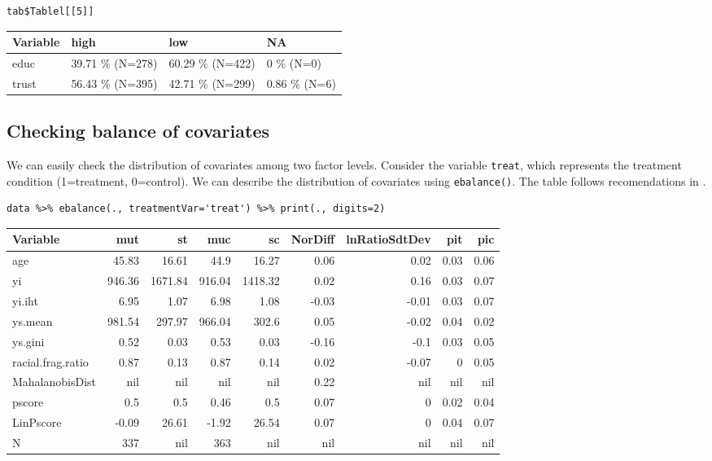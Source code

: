 \documentclass[a4paper]{article}
\begin{document}
\lstset{numbers=left,language=r,label=org3bbdb71,caption= ,captionpos=b}
\begin{lstlisting}
tab$Tablel[[5]]
\end{lstlisting}

\begin{center}
\begin{tabular}{llll}
Variable & high & low & NA\\
\hline
educ & 39.71 \% (N=278) & 60.29 \% (N=422) & 0 \% (N=0)\\
trust & 56.43 \% (N=395) & 42.71 \% (N=299) & 0.86 \% (N=6)\\
\end{tabular}
\end{center}

\subsection{Checking balance of covariates}
\label{sec:org21cd678}

We can easily check the distribution of covariates among two factor levels. Consider the variable \texttt{treat}, which represents the treatment condition (1=treatment, 0=control). We can describe the distribution of covariates using \texttt{ebalance()}. The table follows recomendations in \cite{imbens2015causal}.

\lstset{numbers=left,language=r,label=orge32404c,caption= ,captionpos=b}
\begin{lstlisting}
data %>% ebalance(., treatmentVar='treat') %>% print(., digits=2)

\end{lstlisting}

\begin{center}
\begin{tabular}{lrrrrrrrr}
Variable & mut & st & muc & sc & NorDiff & lnRatioSdtDev & pit & pic\\
\hline
age & 45.83 & 16.61 & 44.9 & 16.27 & 0.06 & 0.02 & 0.03 & 0.06\\
yi & 946.36 & 1671.84 & 916.04 & 1418.32 & 0.02 & 0.16 & 0.03 & 0.07\\
yi.iht & 6.95 & 1.07 & 6.98 & 1.08 & -0.03 & -0.01 & 0.03 & 0.07\\
ys.mean & 981.54 & 297.97 & 966.04 & 302.6 & 0.05 & -0.02 & 0.04 & 0.02\\
ys.gini & 0.52 & 0.03 & 0.53 & 0.03 & -0.16 & -0.1 & 0.03 & 0.05\\
racial.frag.ratio & 0.87 & 0.13 & 0.87 & 0.14 & 0.02 & -0.07 & 0 & 0.05\\
MahalanobisDist & nil & nil & nil & nil & 0.22 & nil & nil & nil\\
pscore & 0.5 & 0.5 & 0.46 & 0.5 & 0.07 & 0 & 0.02 & 0.04\\
LinPscore & -0.09 & 26.61 & -1.92 & 26.54 & 0.07 & 0 & 0.04 & 0.07\\
N & 337 & nil & 363 & nil & nil & nil & nil & nil\\
\end{tabular}
\end{center}
\end{document}
